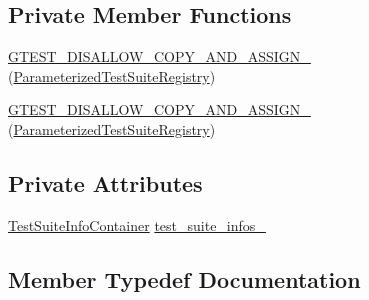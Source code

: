 \subsection*{Private Member Functions}
\begin{DoxyCompactItemize}
\item 
\mbox{\hyperlink{classtesting_1_1internal_1_1_parameterized_test_suite_registry_ac1454da4ff60ddeda6b4e60f1b6ce606}{G\+T\+E\+S\+T\+\_\+\+D\+I\+S\+A\+L\+L\+O\+W\+\_\+\+C\+O\+P\+Y\+\_\+\+A\+N\+D\+\_\+\+A\+S\+S\+I\+G\+N\+\_\+}} (\mbox{\hyperlink{classtesting_1_1internal_1_1_parameterized_test_suite_registry}{Parameterized\+Test\+Suite\+Registry}})
\item 
\mbox{\hyperlink{classtesting_1_1internal_1_1_parameterized_test_suite_registry_ac1454da4ff60ddeda6b4e60f1b6ce606}{G\+T\+E\+S\+T\+\_\+\+D\+I\+S\+A\+L\+L\+O\+W\+\_\+\+C\+O\+P\+Y\+\_\+\+A\+N\+D\+\_\+\+A\+S\+S\+I\+G\+N\+\_\+}} (\mbox{\hyperlink{classtesting_1_1internal_1_1_parameterized_test_suite_registry}{Parameterized\+Test\+Suite\+Registry}})
\end{DoxyCompactItemize}
\subsection*{Private Attributes}
\begin{DoxyCompactItemize}
\item 
\mbox{\hyperlink{classtesting_1_1internal_1_1_parameterized_test_suite_registry_a39a8d3dfa91cb48329bfcf0853f0e72b}{Test\+Suite\+Info\+Container}} \mbox{\hyperlink{classtesting_1_1internal_1_1_parameterized_test_suite_registry_afb0271d017a518724a075986bd16c69c}{test\+\_\+suite\+\_\+infos\+\_\+}}
\end{DoxyCompactItemize}


\subsection{Member Typedef Documentation}
\mbox{\label{classtesting_1_1internal_1_1_parameterized_test_suite_registry_a39a8d3dfa91cb48329bfcf0853f0e72b}} 

